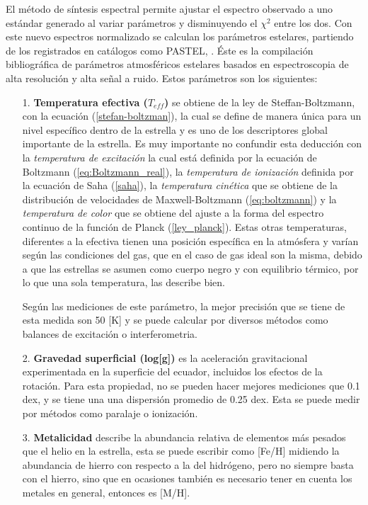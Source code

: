 \documentclass[12pt,oneside,openany,letter]{book}
\begin{document}
\noindent El método de síntesis espectral permite ajustar el espectro observado a uno estándar generado al variar parámetros y disminuyendo el $\chi^2$ entre los dos. Con este nuevo espectros normalizado se calculan los parámetros estelares, partiendo de los registrados en catálogos como PASTEL, \citep{soubiran2016pastel}. Éste es la compilación bibliográfica de parámetros atmosféricos estelares basados en espectroscopia de alta resolución y alta señal a ruido. Estos parámetros son los siguientes:

\begin{itemize}
    \item[1.] \textbf{Temperatura efectiva ($T_{eff}$)}  se obtiene de la ley de Steffan-Boltzmann, con la ecuación (\ref{stefan-boltzman}), la cual se define de manera única para un nivel específico dentro de la estrella y es uno de los descriptores global importante de la estrella. Es muy importante no confundir esta deducción con la \textit{temperatura de excitación} la cual está definida por la ecuación de Boltzmann (\ref{eq:Boltzmann_real}), la \textit{temperatura de ionización} definida por la ecuación de Saha (\ref{saha}), la \textit{temperatura cinética} que se obtiene de la distribución de velocidades de Maxwell-Boltzmann (\ref{eq:boltzmann}) y la \textit{temperatura de color} que se obtiene del ajuste a la forma del espectro continuo de la función de Planck (\ref{ley_planck}). Estas otras temperaturas, diferentes a la efectiva tienen una posición específica en la atmósfera y varían según las condiciones del gas, que en el caso de gas ideal son la misma, debido a que las estrellas se asumen como cuerpo negro y con equilibrio térmico, por lo que una sola temperatura, las describe bien.
    
    \noindent Según las mediciones de este parámetro, la mejor precisión que se tiene de esta medida son 50 [K] y se puede calcular por diversos métodos como balances de excitación o interferometria.
    
    \item[2.] \textbf{Gravedad superficial (log[g])} es la aceleración gravitacional experimentada en la superficie del ecuador, incluidos los efectos de la rotación. Para esta propiedad, no se pueden hacer mejores mediciones que 0.1 dex, y se tiene una una dispersión promedio de 0.25 dex. Esta se puede medir por métodos como paralaje o ionización. 
    
    \item[3.] \textbf{Metalicidad} describe la abundancia relativa de elementos más pesados que el helio en la estrella, esta se puede escribir como [Fe/H] midiendo la abundancia de hierro con respecto a la del hidrógeno, pero no siempre basta con el hierro, sino que en ocasiones también es necesario tener en cuenta los metales en general, entonces es [M/H].


\end{itemize}
\end{document}

